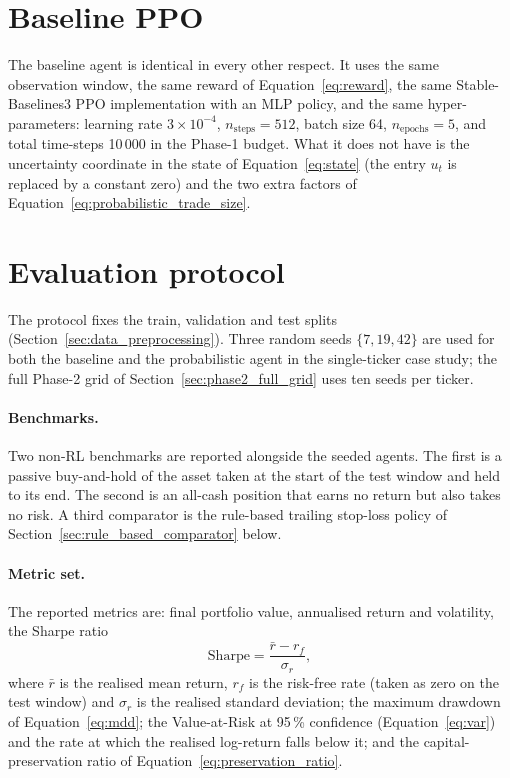\section{Baseline PPO}
\label{sec:baseline_ppo}

The baseline agent is identical in every other respect. It uses the same observation window, the same reward of Equation~\ref{eq:reward}, the same Stable-Baselines3 PPO implementation with an MLP policy, and the same hyper-parameters: learning rate $3 \times 10^{-4}$, $n_{\mathrm{steps}} = 512$, batch size 64, $n_{\mathrm{epochs}} = 5$, and total time-steps 10\,000 in the Phase-1 budget. What it does not have is the uncertainty coordinate in the state of Equation~\ref{eq:state} (the entry $u_t$ is replaced by a constant zero) and the two extra factors of Equation~\ref{eq:probabilistic_trade_size}.

\section{Evaluation protocol}
\label{sec:evaluation_protocol}

The protocol fixes the train, validation and test splits (Section~\ref{sec:data_preprocessing}). Three random seeds $\{7, 19, 42\}$ are used for both the baseline and the probabilistic agent in the single-ticker case study; the full Phase-2 grid of Section~\ref{sec:phase2_full_grid} uses ten seeds per ticker.

\paragraph{Benchmarks.} Two non-RL benchmarks are reported alongside the seeded agents. The first is a passive buy-and-hold of the asset taken at the start of the test window and held to its end. The second is an all-cash position that earns no return but also takes no risk. A third comparator is the rule-based trailing stop-loss policy of Section~\ref{sec:rule_based_comparator} below.

\paragraph{Metric set.} The reported metrics are: final portfolio value, annualised return and volatility, the Sharpe ratio
\begin{equation}
  \label{eq:sharpe}
  \mathrm{Sharpe} = \frac{\bar{r} - r_f}{\sigma_r},
\end{equation}
where $\bar{r}$ is the realised mean return, $r_f$ is the risk-free rate (taken as zero on the test window) and $\sigma_r$ is the realised standard deviation; the maximum drawdown of Equation~\ref{eq:mdd}; the Value-at-Risk at 95\,\% confidence (Equation~\ref{eq:var}) and the rate at which the realised log-return falls below it; and the capital-preservation ratio of Equation~\ref{eq:preservation_ratio}.

